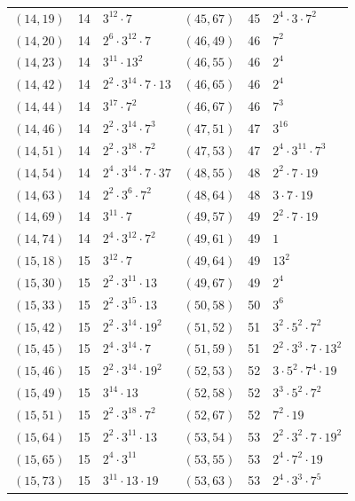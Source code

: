 \documentclass[11pt]{article}
\begin{document}
\begin{longtable}{@{}lrl@{\qquad}lrl@{}}
$(14,19)$ & 14 & $3^{12}\cdot 7$ & $(45,67)$ & 45 & $2^{4}\cdot 3\cdot 7^{2}$\\
$(14,20)$ & 14 & $2^{6}\cdot 3^{12}\cdot 7$ & $(46,49)$ & 46 & $7^{2}$\\
$(14,23)$ & 14 & $3^{11}\cdot 13^{2}$ & $(46,55)$ & 46 & $2^{4}$\\
$(14,42)$ & 14 & $2^{2}\cdot 3^{14}\cdot 7\cdot 13$ & $(46,65)$ & 46 & $2^{4}$\\
$(14,44)$ & 14 & $3^{17}\cdot 7^{2}$ & $(46,67)$ & 46 & $7^{3}$\\
$(14,46)$ & 14 & $2^{2}\cdot 3^{14}\cdot 7^{3}$ & $(47,51)$ & 47 & $3^{16}$\\
$(14,51)$ & 14 & $2^{2}\cdot 3^{18}\cdot 7^{2}$ & $(47,53)$ & 47 & $2^{4}\cdot 3^{11}\cdot 7^{3}$\\
$(14,54)$ & 14 & $2^{4}\cdot 3^{14}\cdot 7\cdot 37$ & $(48,55)$ & 48 & $2^{2}\cdot 7\cdot 19$\\
$(14,63)$ & 14 & $2^{2}\cdot 3^{6}\cdot 7^{2}$ & $(48,64)$ & 48 & $3\cdot 7\cdot 19$\\
$(14,69)$ & 14 & $3^{11}\cdot 7$ & $(49,57)$ & 49 & $2^{2}\cdot 7\cdot 19$\\
$(14,74)$ & 14 & $2^{4}\cdot 3^{12}\cdot 7^{2}$ & $(49,61)$ & 49 & $1$\\
$(15,18)$ & 15 & $3^{12}\cdot 7$ & $(49,64)$ & 49 & $13^{2}$\\
$(15,30)$ & 15 & $2^{2}\cdot 3^{11}\cdot 13$ & $(49,67)$ & 49 & $2^{4}$\\
$(15,33)$ & 15 & $2^{2}\cdot 3^{15}\cdot 13$ & $(50,58)$ & 50 & $3^{6}$\\
$(15,42)$ & 15 & $2^{2}\cdot 3^{14}\cdot 19^{2}$ & $(51,52)$ & 51 & $3^{2}\cdot 5^{2}\cdot 7^{2}$\\
$(15,45)$ & 15 & $2^{4}\cdot 3^{14}\cdot 7$ & $(51,59)$ & 51 & $2^{2}\cdot 3^{3}\cdot 7\cdot 13^{2}$\\
$(15,46)$ & 15 & $2^{2}\cdot 3^{14}\cdot 19^{2}$ & $(52,53)$ & 52 & $3\cdot 5^{2}\cdot 7^{4}\cdot 19$\\
$(15,49)$ & 15 & $3^{14}\cdot 13$ & $(52,58)$ & 52 & $3^{3}\cdot 5^{2}\cdot 7^{2}$\\
$(15,51)$ & 15 & $2^{2}\cdot 3^{18}\cdot 7^{2}$ & $(52,67)$ & 52 & $7^{2}\cdot 19$\\
$(15,64)$ & 15 & $2^{2}\cdot 3^{11}\cdot 13$ & $(53,54)$ & 53 & $2^{2}\cdot 3^{2}\cdot 7\cdot 19^{2}$\\
$(15,65)$ & 15 & $2^{4}\cdot 3^{11}$ & $(53,55)$ & 53 & $2^{4}\cdot 7^{2}\cdot 19$\\
$(15,73)$ & 15 & $3^{11}\cdot 13\cdot 19$ & $(53,63)$ & 53 & $2^{4}\cdot 3^{3}\cdot 7^{5}$\\

\end{longtable}
\end{document}

